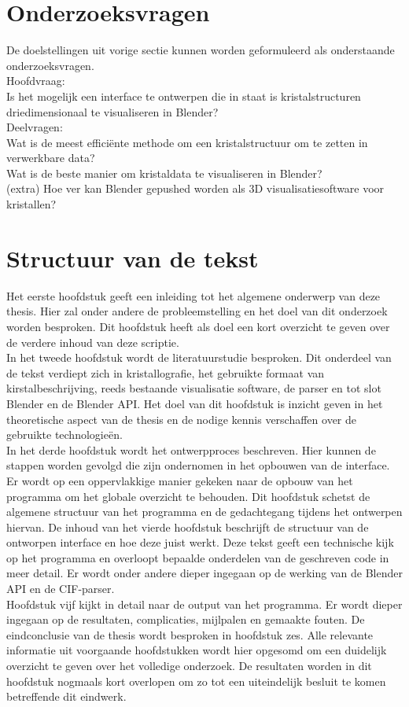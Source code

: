 \section{Onderzoeksvragen}
De doelstellingen uit vorige sectie kunnen worden geformuleerd als onderstaande onderzoeksvragen.
\\
Hoofdvraag:
\\
Is het mogelijk een interface te ontwerpen die in staat is kristalstructuren driedimensionaal te visualiseren in Blender?
\\
Deelvragen:
\\
Wat is de meest efficiënte methode om een kristalstructuur om te zetten in verwerkbare data?
\\
Wat is de beste manier om kristaldata te visualiseren in Blender?
\\
(extra) Hoe ver kan Blender gepushed worden als 3D visualisatiesoftware voor kristallen? 


\section{Structuur van de tekst}
Het eerste hoofdstuk geeft een inleiding tot het algemene onderwerp van deze thesis. Hier zal onder andere de probleemstelling en het doel van dit onderzoek worden besproken. Dit hoofdstuk heeft als doel een kort overzicht te geven over de verdere inhoud van deze scriptie.  
\\
In het tweede hoofdstuk wordt de literatuurstudie besproken. Dit onderdeel van de tekst verdiept zich in kristallografie, het gebruikte formaat van kirstalbeschrijving, reeds bestaande visualisatie software, de parser en tot slot Blender en de Blender API. Het doel van dit hoofdstuk is inzicht geven in het theoretische aspect van de thesis en de nodige kennis verschaffen over de gebruikte technologieën.
\\
In het derde hoofdstuk wordt het ontwerpproces beschreven. Hier kunnen de stappen worden gevolgd die zijn ondernomen in het opbouwen van de interface. Er wordt op een oppervlakkige manier gekeken naar de opbouw van het programma om het globale overzicht te behouden. Dit hoofdstuk schetst de algemene structuur van het programma en de gedachtegang tijdens het ontwerpen hiervan.
De inhoud van het vierde hoofdstuk beschrijft de structuur van de ontworpen interface en hoe deze juist werkt. Deze tekst geeft een technische kijk op het programma en overloopt bepaalde onderdelen van de geschreven code in meer detail. Er wordt onder andere dieper ingegaan op de werking van de Blender API en de CIF-parser.
\\
Hoofdstuk vijf kijkt in detail naar de output van het programma. Er wordt dieper ingegaan op de resultaten, complicaties, mijlpalen en gemaakte fouten. 
De eindconclusie van de thesis wordt besproken in hoofdstuk zes. Alle relevante informatie uit voorgaande hoofdstukken wordt hier opgesomd om een duidelijk overzicht te geven over het volledige onderzoek. De resultaten worden in dit hoofdstuk nogmaals kort overlopen om zo tot een uiteindelijk besluit te komen betreffende dit eindwerk.
\\


